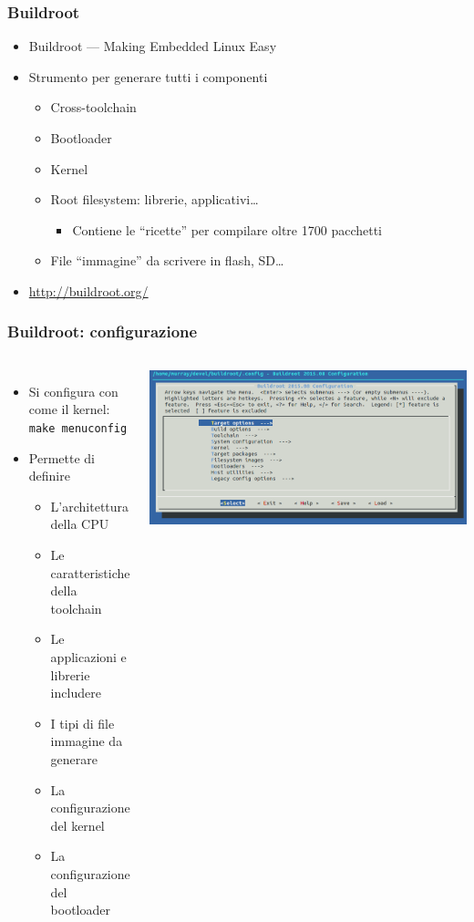 \documentclass[xetex,table]{beamer}
\begin{document}
\begin{frame}
\frametitle{Buildroot}
  \begin{itemize}
  \item Buildroot --- Making Embedded Linux Easy
  \item Strumento per generare tutti i componenti
    \begin{itemize}
    \item Cross-toolchain
    \item Bootloader
    \item Kernel
    \item Root filesystem: librerie, applicativi\ldots
      \begin{itemize}
      \item Contiene le ``ricette'' per compilare oltre 1700 pacchetti
      \end{itemize}
    \item File ``immagine'' da scrivere in flash, SD\ldots
    \end{itemize}
  \item \url{http://buildroot.org/}
  \end{itemize}
\end{frame}

\begin{frame}
  \frametitle{Buildroot: configurazione}
  \begin{columns}
    \begin{itemize}
    \item Si configura con  come il kernel:\\
      \texttt{make menuconfig}
    \item Permette di definire
      \begin{itemize}
      \item L'architettura della CPU
      \item Le caratteristiche della toolchain
      \item Le applicazioni e librerie includere
      \item I tipi di file immagine da generare
      \item La configurazione del kernel
      \item La configurazione del bootloader
      \end{itemize}
    \end{itemize}
    \includegraphics[width=\textwidth]{images/buildroot.png}
  \end{columns}
\end{frame}
\end{document}
